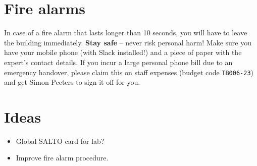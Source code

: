 \documentclass[12pt, a4paper]{article}
\begin{document}
\section{Fire alarms}
In case of a fire alarm that lasts longer than 10 seconds, you will have to leave the building immediately. {\bf Stay safe} -- never risk personal harm! Make sure you have your mobile phone (with Slack installed!) and a piece of paper with the expert's contact details. If you incur a large personal phone bill due to an emergency handover, please claim this on staff expenses (budget code {\tt TB006-23}) and get Simon Peeters to sign it off for you.

\section{Ideas}
\begin{itemize}
	\item Global SALTO card for lab?
	\item Improve fire alarm procedure.
\end{itemize}

\end{document}
